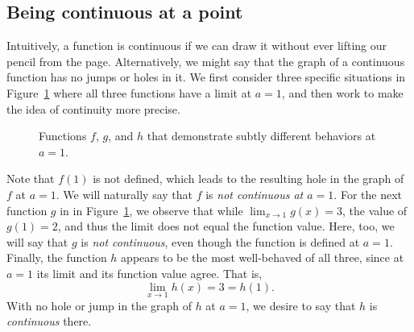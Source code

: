 

\subsection*{Being continuous at a point} 

Intuitively, a function is continuous if we can draw it without ever lifting our pencil from the page.  Alternatively, we might say that the graph of a continuous function has no jumps or holes in it.  We first consider three specific situations in Figure~\ref{F:1.7.Cont} where all three functions have a limit at $a = 1$, and then work to make the idea of continuity more precise.

\begin{figure}[h]
\begin{center}
\caption{Functions $f$, $g$, and $h$ that demonstrate subtly different behaviors at $a = 1$.} \label{F:1.7.Cont}
\end{center}
\end{figure}

Note that  $f(1)$ is not defined, which leads to the resulting hole in the graph of $f$ at $a = 1$.  We will naturally say that $f$ is \emph{not continuous at $a = 1$}.  For the next function $g$ in in Figure~\ref{F:1.7.Cont}, we observe that while $\lim_{x \to 1} g(x) = 3$, the value of $g(1) = 2$, and thus the limit does not equal the function value.  Here, too, we will say that $g$ is \emph{not continuous}, even though the function is defined at $a = 1$.  Finally, the function $h$ appears to be the most well-behaved of all three, since at $a = 1$ its limit and its function value agree.  That is,
$$\lim_{x \to 1} h(x) = 3 = h(1).$$
With no hole or jump in the graph of $h$ at $a = 1$, we desire to say that $h$ is \emph{continuous} there.

